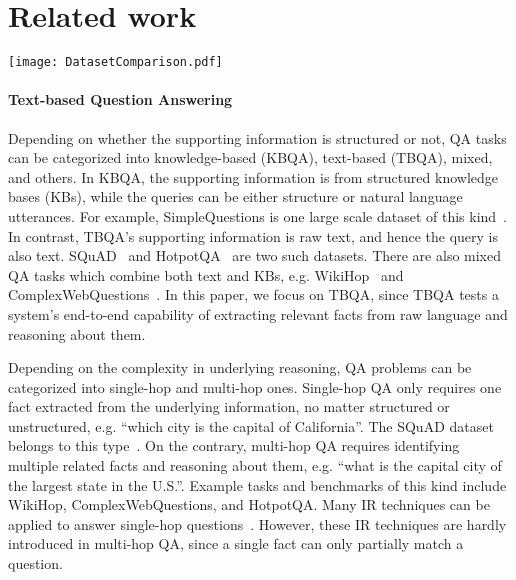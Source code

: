 \documentclass[11pt,a4paper]{article}
\newcommand{\hotpotqa}{HotpotQA\xspace}
\begin{document}
\section{Related work}
\label{sec:related}
\begin{figure*}[t]
\begin{center}
\texttt{[image: DatasetComparison.pdf]}
\end{center}
\caption{Comparison between HotpotQA (left) and WikiHop (right). In HotpotQA, the questions are proposed by crowd workers and the blue words in paragraphs are labeled supporting facts corresponding to the question. In WikiHop, the questions and answers are formed with relations and entities in the underlying KB respectively, thus the questions are inherently restricted by the KB schema. The colored words and phrases are entities in the KB.}
\label{fig:dataset}
\end{figure*}

\paragraph{Text-based Question Answering}
Depending on whether the supporting information is structured or not, 
QA tasks can be categorized into knowledge-based (KBQA), text-based (TBQA), mixed, and others. 
In KBQA, the supporting information is from structured knowledge bases (KBs), while the queries can be either structure or natural language utterances. 
For example, SimpleQuestions is one large scale dataset of this kind~\cite{bordes2015large}.
In contrast, TBQA's supporting information is raw text, and hence the query is also text.
SQuAD~\cite{rajpurkar2016squad} and \hotpotqa~\cite{yang2018hotpotqa} are two such datasets. 
There are also mixed QA tasks which combine both text and KBs, e.g. WikiHop~\cite{welbl2018constructing} and ComplexWebQuestions~\cite{talmor2018web}.
In this paper, we focus on TBQA, since TBQA tests a system's end-to-end capability of extracting relevant facts from raw language and reasoning about them. 



Depending on the complexity in underlying reasoning, QA problems can be categorized into single-hop and multi-hop ones. 
Single-hop QA only requires one fact extracted from the underlying information, no matter structured or unstructured, 
e.g. ``which city is the capital of California''.
The SQuAD dataset belongs to this type~\cite{rajpurkar2016squad}.
On the contrary, multi-hop QA requires identifying multiple related facts 
and reasoning about them, e.g. ``what is the capital city of the largest state in the U.S.''.
Example tasks and benchmarks of this kind include WikiHop, ComplexWebQuestions, and \hotpotqa.
Many IR techniques can be applied to answer single-hop questions~\cite{rajpurkar2016squad}. 
However, these IR techniques are hardly introduced in multi-hop QA, since a single fact can only partially match a question.
\end{document}
